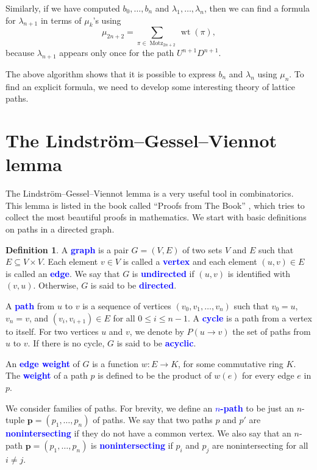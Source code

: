 \documentclass[oneside]{book}
\numberwithin{equation}{section}
\theoremstyle{definition}
\newtheorem{defn}[thm]{Definition}
\newcommand\Motz{\operatorname{Motz}}
\newcommand\wt{\operatorname{wt}}
\renewcommand\vec[1]{\bm{#1}}
\renewcommand\emph[1]{\textcolor{blue}{\bf #1}}
\begin{document}
Similarly, if we have computed \( b_0,\dots,b_{n} \) and
\( \lambda_1,\dots,\lambda_n \), then we can find a formula for
\( \lambda_{n+1} \) in terms of \( \mu_k \)'s using
\[
  \mu_{2n+2} = \sum_{\pi\in \Motz_{2n+2}} \wt(\pi),
\]
because \( \lambda_{n+1} \) appears only once for the path
\( U^{n+1}D^{n+1} \).

The above algorithm shows that it is possible to express \( b_n \) and
\( \lambda_n \) using \( \mu_n \). To find an explicit formula, we
need to develop some interesting theory of lattice paths.


\section{The Lindstr\"om--Gessel--Viennot lemma}

The Lindstr\"om--Gessel--Viennot lemma \cite{Lindstrom,GesselViennot}
is a very useful tool in combinatorics. This lemma is listed in the
book called ``Proofs from The Book'' \cite[Chapter~32]{Aigner2018},
which tries to collect the most beautiful proofs in mathematics. We
start with basic definitions on paths in a directed graph.


\begin{defn}\label{def:5}
  A \emph{graph} is a pair \( G= (V,E) \) of two sets \( V \) and
  \( E \) such that \( E\subseteq V\times V \). Each element
  \( v\in V \) is called a \emph{vertex} and each element
  \( (u,v)\in E \) is called an \emph{edge}. We say that \( G \) is
  \emph{undirected} if \( (u,v) \) is identified with \( (v,u) \).
  Otherwise, \( G \) is said to be \emph{directed}.

  A \emph{path} from \( u \) to \( v \) is a sequence of vertices
  \( (v_0,v_1,\dots,v_n) \) such that \( v_0=u \), \( v_n=v \), and
  \( (v_i,v_{i+1})\in E \) for all \( 0\le i\le n-1 \). A \emph{cycle}
  is a path from a vertex to itself. For two vertices \( u \) and
  \( v \), we denote by \( P(u\to v) \) the set of paths from \( u \)
  to \( v \). If there is no cycle, \( G \) is said to be
  \emph{acyclic}. 

  An \emph{edge weight} of \( G \) is a function \( w:E \to K \), for
  some commutative ring \( K \). The \emph{weight} of a path \( p \)
  is defined to be the product of \( w(e) \) for every edge \( e \) in
  \( p \).
\end{defn}


We consider families of paths. For brevity, we define an
\emph{\( n \)-path} to be just an \( n \)-tuple
\( \vec p = (p_1,\dots,p_n) \) of paths. We say that two paths \( p \)
and \( p' \) are \emph{nonintersecting} if they do not have a common
vertex. We also say that an \( n \)-path
\( \vec p = (p_1,\dots,p_n) \) is \emph{nonintersecting} if \( p_i \)
and \( p_j \) are nonintersecting for all \( i\ne j \).
\end{document}
